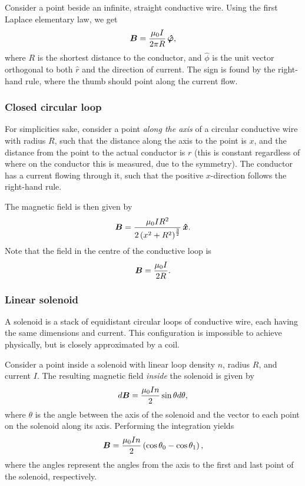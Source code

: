         Consider a point beside an infinite, straight conductive wire. Using the first Laplace elementary law, we get 
        \begin{equation}
            \B = \frac{\mu_0 I}{2\pi R}\,\hat{\phi},
        \end{equation}
        where $R$ is the shortest distance to the conductor, 
        and $\hat{\phi}$ is the  unit vector orthogonal to both $\hat{r}$ and the direction of current.
        The sign is found by the right-hand rule, where the thumb should point along the current flow.
        
    \subsubsection*{Closed circular loop}
        For simplicities sake, consider a point \textit{along the axis} of a circular conductive wire with radius $R$, 
        such that the distance along the axis to the point is $x$, 
        and the distance from the point to the actual conductor is $r$ 
        (this is constant regardless of where on the conductor this is measured, due to the symmetry).
        The conductor has a current flowing through it, such that the positive $x$-direction follows the right-hand rule. 

        The magnetic field is then given by
        \begin{equation}
            \B = \frac{\mu_0 I R^2}{2 \left(x^2 + R^2\right)^\frac{3}{2}}\,\hat{x}.
        \end{equation}
        Note that the field in the centre of the conductive loop is
        \begin{equation}
            \bm{B} = \frac{\mu_0 I}{2R}.
        \end{equation}
    
    \subsubsection*{Linear solenoid}
        A solenoid is a stack of equidistant circular loops of conductive wire, each having the same dimensions and current. 
        This configuration is impossible to achieve physically, but is closely approximated by a coil. 

        Consider a point inside a solenoid with linear loop density $n$, radius $R$, and current $I$. 
        The resulting magnetic field \textit{inside} the solenoid is given by
        \begin{equation}
            d\bm{B} = \frac{\mu_0 I n}{2}\sin\theta d\theta,
        \end{equation}
        where $\theta$ is the angle between the axis of the solenoid and the vector to each point on the solenoid along its axis.
        Performing the integration yields
        \begin{equation}
            \bm{B} = \frac{\mu_0 In}{2}\left(\cos\theta_0 - \cos\theta_1\right),
        \end{equation}
        where the angles represent the angles from the axis to the first and last point of the solenoid, respectively. 

